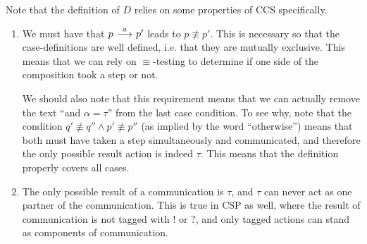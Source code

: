 Note that the definition of $D$ relies on some properties of CCS specifically.
\begin{enumerate}
    \item We must have that $p \ {\stackrel{{a}}{\longrightarrow}}\  p'$ leads to $p\not\equiv p'$. This is
          necessary so that the case-definitions are well defined, i.e. that
          they are mutually exclusive. This means that we can rely on
          $\equiv$-testing to determine if one side of the composition took
          a step or not.

          We should also note that this requirement means that we can actually
          remove the text ``and $\alpha=\tau$'' from the last case condition. To
          see why, note that the condition $q'\not\equiv q'' \land p'\not\equiv p''$
          (as implied by the word ``otherwise'') means that both must have taken
          a step simultaneously and communicated,  and therefore the only possible
          result action is indeed $\tau$. This means that the definition properly
          covers all cases.
    \item The only possible result of a communication is $\tau$, and $\tau$
          can never act as one partner of the communication. This is true in CSP
          as well, where the result of communication is not tagged with $!$ or
          $?$, and only tagged actions can stand as components of communication.
\end{enumerate}


